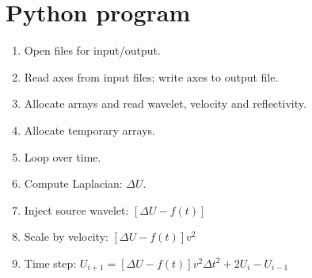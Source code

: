 \newpage
\section{Python program}
\lstset{language=python,numbers=left,numberstyle=\tiny,showstringspaces=false}
\renewcommand{\rsfafdm}{\RSF/api/python/test/afdm.py}

\tiny

\normalsize
\newpage


\begin{enumerate}
\item Open files for input/output.
\tiny

\normalsize

\item Read axes from input files; write axes to output file.
\tiny

\normalsize

\item Allocate arrays and read wavelet, velocity and reflectivity.
\tiny

\normalsize

\item Allocate temporary arrays.
\tiny

\normalsize

\item Loop over time.
\tiny

\normalsize

\item Compute Laplacian: $\Delta U$.
\tiny

\normalsize

\item Inject source wavelet: $\left[ \Delta U - f(t) \right]$
\tiny

\normalsize

\item Scale by velocity: $\left[ \Delta U - f(t) \right] v^2$
\tiny

\normalsize

\item Time step: 
$U_{i+1} = \left[ \Delta U -f(t) \right] v^2 \Delta t^2 + 2 U_{i} - U_{i-1}$
\tiny

\normalsize

\end{enumerate}

